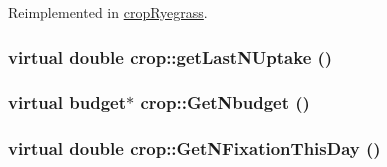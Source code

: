 Reimplemented in \hyperlink{classcrop_ryegrass_a02c5bec33e0f0a6240c34dde03a09e01}{cropRyegrass}.\hypertarget{classcrop_aca02c95647c1bcb413c8bc53d4702b09}{
\subsubsection[{getLastNUptake}]{\setlength{\rightskip}{0pt plus 5cm}virtual double crop::getLastNUptake ()}}
\label{classcrop_aca02c95647c1bcb413c8bc53d4702b09}
\hypertarget{classcrop_aa5d7748725ee956e02db1e248ddaa9fb}{
\subsubsection[{GetNbudget}]{\setlength{\rightskip}{0pt plus 5cm}virtual {\bf budget}$\ast$ crop::GetNbudget ()}}
\label{classcrop_aa5d7748725ee956e02db1e248ddaa9fb}
\hypertarget{classcrop_aec045be7b4c6fd112b48ead6ee68dcd9}{
\subsubsection[{GetNFixationThisDay}]{\setlength{\rightskip}{0pt plus 5cm}virtual double crop::GetNFixationThisDay ()}}
\label{classcrop_aec045be7b4c6fd112b48ead6ee68dcd9}


